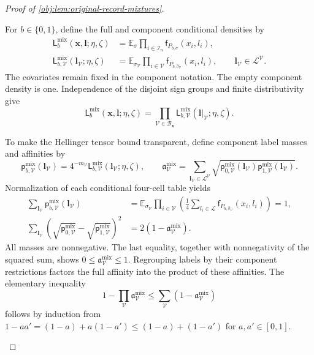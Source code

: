 \begin{proof}[Proof of \cref{obj:lem:original-record-mixtures}]
\begin{enumerate}
For \(b\in\{0,1\}\), define the full and component conditional densities
by
\[
\begin{aligned}
\mathsf L_b^{\mathrm{mix}}(\mathbf x,\boldsymbol l;\eta,\zeta)
&=\mathbb E_\sigma
\prod_{i\in\mathcal I_n}
\mathsf f_{P_{b,\sigma}}(x_i,l_i),\\
\mathsf L_{b,\mathcal V}^{\mathrm{mix}}
(\boldsymbol l_{\mathcal V};\eta,\zeta)
&=\mathbb E_{\sigma_{\mathcal V}}
\prod_{i\in\mathcal V}
\mathsf f_{P_{b,\widehat\sigma_{\mathcal V}}}(x_i,l_i),
\qquad
\boldsymbol l_{\mathcal V}\in\mathscr L^{\mathcal V}.
\end{aligned}
\]
The covariates remain fixed in the component notation. The empty
component density is one. Independence of the disjoint sign groups
and finite distributivity give
\[
\mathsf L_b^{\mathrm{mix}}(\mathbf x,\boldsymbol l;\eta,\zeta)
=
\prod_{\mathcal V\in\mathscr B_{\mathbf x}}
\mathsf L_{b,\mathcal V}^{\mathrm{mix}}
(\boldsymbol l|_{\mathcal V};\eta,\zeta).
\]

To make the Hellinger tensor bound transparent, define component label
masses and affinities by
\[
\mathsf p_{b,\mathcal V}^{\mathrm{mix}}(\boldsymbol l_{\mathcal V})
=4^{-m_{\mathcal V}}
\mathsf L_{b,\mathcal V}^{\mathrm{mix}}
(\boldsymbol l_{\mathcal V};\eta,\zeta),
\qquad
\mathfrak a_{\mathcal V}^{\mathrm{mix}}
=
\sum_{\boldsymbol l_{\mathcal V}\in\mathscr L^{\mathcal V}}
\sqrt{\mathsf p_{0,\mathcal V}^{\mathrm{mix}}
(\boldsymbol l_{\mathcal V})
\mathsf p_{1,\mathcal V}^{\mathrm{mix}}
(\boldsymbol l_{\mathcal V})}.
\]
Normalization of each conditional four-cell table yields
\[
\begin{aligned}
\sum_{\boldsymbol l_{\mathcal V}}
\mathsf p_{b,\mathcal V}^{\mathrm{mix}}(\boldsymbol l_{\mathcal V})
&=
\mathbb E_{\sigma_{\mathcal V}}
\prod_{i\in\mathcal V}
\left(\frac14\sum_{l_i\in\mathscr L}
\mathsf f_{P_{b,\widehat\sigma_{\mathcal V}}}(x_i,l_i)\right)
=1,\\
\sum_{\boldsymbol l_{\mathcal V}}
\left(\sqrt{\mathsf p_{0,\mathcal V}^{\mathrm{mix}}}
-\sqrt{\mathsf p_{1,\mathcal V}^{\mathrm{mix}}}\right)^2
&=2(1-\mathfrak a_{\mathcal V}^{\mathrm{mix}}).
\end{aligned}
\]
All masses are nonnegative. The last equality, together with
nonnegativity of the squared sum, shows
\(0\le\mathfrak a_{\mathcal V}^{\mathrm{mix}}\le1\).
Regrouping labels by their component restrictions factors the full
affinity into the product of these affinities. The elementary
inequality
\[
1-\prod_{\mathcal V}\mathfrak a_{\mathcal V}^{\mathrm{mix}}
\le
\sum_{\mathcal V}(1-\mathfrak a_{\mathcal V}^{\mathrm{mix}})
\]
follows by induction from
\(1-aa'=(1-a)+a(1-a')\le(1-a)+(1-a')\) for
\(a,a'\in[0,1]\).


\end{enumerate}
\end{proof}
